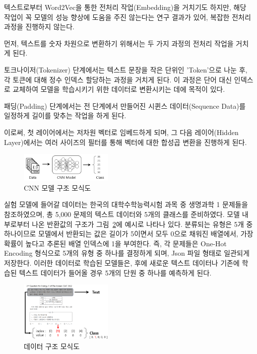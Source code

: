 \documentclass{kcc}
\begin{document}
텍스트로부터 Word2Vec을 통한 전처리 작업(Embedding)\cite{cite:zhang2024teleclass}을 거치기도 하지만, 해당 작업이 꼭 모델의 성능 향상에 도움을 주진 않는다는 연구 결과\cite{cite:word2vec}가 있어, 복잡한 전처리 과정을 진행하지 않는다.\cite{cite:jiang2024quick}

먼저, 텍스트를 숫자 차원으로 변환하기 위해서는 두 가지 과정의 전처리 작업을 거치게 된다.

토크나이저(Tokenizer) 단계에서는 텍스트 문장을 작은 단위인 'Token'\cite{cite:OnlineTokenizer}으로 나눈 후, 각 토큰에 대해 정수 인덱스 할당하는 과정\cite{cite:TokenizerforCNN}을 거치게 된다. 이 과정은 단어 대신 인덱스로 교체하여 모델을 학습시키기 위한 데이터로 변환시키는 데에 목적이 있다.

패딩(Padding) 단계에서는 전 단계에서 만들어진 시퀸스 데이터(Sequence Data)를 일정하게 길이를 맞추는 작업\cite{cite:Lopez-delRio2020EffectOfSequencePadding}을 하게 된다.

이로써, 첫 레이어에서는 저차원 벡터로 임베드\cite{cite:Reddy2020EffectOfPadding}하게 되며, 그 다음 레이어(Hidden Layer)에서는 여러 사이즈의 필터를 통해 벡터에 대한 합성곱 변환\cite{cite:IntroductionforCNN}을 진행하게 된다.

\begin{figure}[!ht]
\centering
\includegraphics[width=0.4\textwidth]{figs/fig_layout}
\caption{CNN 모델 구조 모식도}
\label{fig:example1}
\end{figure}

실험 모델에 들어갈 데이터는 한국의 대학수학능력시험 과목 중 생명과학 1 문제들을 참조하였으며, 총 5,000 문제의 텍스트 데이터와 5개의 클래스를 준비하였다. 모델 내부로부터 나온 반환값의 구조가 그림~\ref{fig:example1}에 예시로 나타나 있다. 분류되는 유형은 5개 중 하나이므로 모델에서 반환되는 값은 길이가 5이면서 모두 0으로 채워진 배열에서, 가장 확률이 높다고 추론된 배열 인덱스에 1을 부여한다. 즉, 각 문제들은 One-Hot Encoding 형식으로 5개의 유형 중 하나를 결정하게 되며, Json 파일 형태로 일관되게 저장한다. 이러한 데이터로 학습된 모델들은, 후에 새로운 텍스트 데이터나 기존에 학습된 텍스트 데이터가 들어올 경우 5개의 단원 중 하나를 예측하게 된다.

\begin{figure}[!ht]
\centering
\includegraphics[width=0.4\textwidth]{figs/dataFigure}
\caption{데이터 구조 모식도}
\label{fig:example1}
\end{figure}
\end{document}
